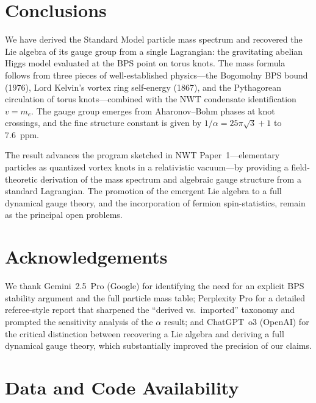 \documentclass[11pt]{article}
\begin{document}
\section{Conclusions}
\label{sec:conclusions}

We have derived the Standard Model particle mass spectrum and
recovered the Lie algebra of its gauge group from a single
Lagrangian: the gravitating abelian Higgs model evaluated at the
BPS point on torus knots.  The mass formula follows
from three pieces of well-established physics---the Bogomolny BPS
bound (1976), Lord Kelvin's vortex ring self-energy (1867), and the
Pythagorean circulation of torus knots---combined with the NWT
condensate identification $v = m_e$.  The gauge group emerges from
Aharonov--Bohm phases at knot crossings, and the fine structure
constant is given by $1/\alpha = 25\pi\sqrt{3} + 1$ to 7.6~ppm.

The result advances the program sketched in NWT Paper~1---elementary
particles as quantized vortex knots in a relativistic vacuum---by
providing a field-theoretic derivation of the mass spectrum and
algebraic gauge structure from a standard Lagrangian.  The promotion
of the emergent Lie algebra to a full dynamical gauge theory, and
the incorporation of fermion spin-statistics, remain as the principal
open problems.


\section*{Acknowledgements}

We thank Gemini~2.5~Pro (Google) for identifying the need for an
explicit BPS stability argument and the full particle mass table;
Perplexity Pro for a detailed referee-style report that sharpened
the ``derived vs.\ imported'' taxonomy and prompted the sensitivity
analysis of the $\alpha$ result; and ChatGPT~o3 (OpenAI) for the
critical distinction between recovering a Lie algebra and deriving
a full dynamical gauge theory, which substantially improved the
precision of our claims.

\section*{Data and Code Availability}
\end{document}
